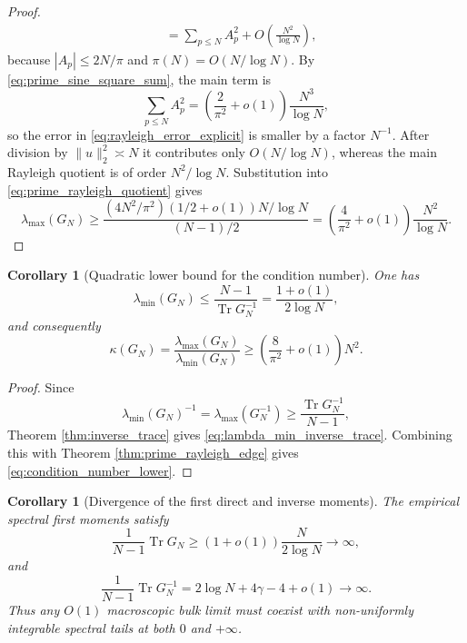 \documentclass[11pt]{amsart}
\numberwithin{equation}{section}
\theoremstyle{plain}
\newtheorem{corollary}[theorem]{Corollary}
\theoremstyle{definition}
\theoremstyle{remark}
\newcommand{\Tr}{\operatorname{Tr}}
\begin{document}
\begin{proof}
\begin{align}
&=\sum_{p\le N}A_p^2
 +O\!\left(\frac{N^2}{\log N}\right),
\label{eq:rayleigh_error_explicit}
\end{align}
because $|A_p|\le 2N/\pi$ and $\pi(N)=O(N/\log N)$.  By \eqref{eq:prime_sine_square_sum}, the main term is
\begin{equation}
\sum_{p\le N}A_p^2
=\left(\frac{2}{\pi^2}+o(1)\right)\frac{N^3}{\log N},
\end{equation}
so the error in \eqref{eq:rayleigh_error_explicit} is smaller by a factor $N^{-1}$.  After division by $\|u\|_2^2\asymp N$ it contributes only $O(N/\log N)$, whereas the main Rayleigh quotient is of order $N^2/\log N$.  Substitution into \eqref{eq:prime_rayleigh_quotient} gives
\begin{equation}
\lambda_{\max}(G_N)
\ge
\frac{(4N^2/\pi^2)(1/2+o(1))N/\log N}{(N-1)/2}
=
\left(\frac4{\pi^2}+o(1)\right)\frac{N^2}{\log N}.
\end{equation}
\end{proof}

\begin{corollary}[Quadratic lower bound for the condition number]
\label{cor:condition_number_lower}
One has
\begin{equation}
\lambda_{\min}(G_N)
\le \frac{N-1}{\Tr G_N^{-1}}
=\frac{1+o(1)}{2\log N},
\label{eq:lambda_min_inverse_trace}
\end{equation}
and consequently
\begin{equation}
\kappa(G_N)
=\frac{\lambda_{\max}(G_N)}{\lambda_{\min}(G_N)}
\ge
\left(\frac{8}{\pi^2}+o(1)\right)N^2.
\label{eq:condition_number_lower}
\end{equation}
\end{corollary}

\begin{proof}
Since
\begin{equation}
\lambda_{\min}(G_N)^{-1}
=\lambda_{\max}(G_N^{-1})
\ge \frac{\Tr G_N^{-1}}{N-1},
\end{equation}
Theorem \ref{thm:inverse_trace} gives \eqref{eq:lambda_min_inverse_trace}.  Combining this with Theorem \ref{thm:prime_rayleigh_edge} gives \eqref{eq:condition_number_lower}.
\end{proof}

\begin{corollary}[Divergence of the first direct and inverse moments]
\label{cor:moment_divergence}
The empirical spectral first moments satisfy
\begin{equation}
\frac{1}{N-1}\Tr G_N
\ge (1+o(1))\frac{N}{2\log N}\longrightarrow\infty,
\label{eq:direct_first_moment_diverges}
\end{equation}
and
\begin{equation}
\frac{1}{N-1}\Tr G_N^{-1}
=2\log N+4\gamma-4+o(1)\longrightarrow\infty.
\label{eq:inverse_first_moment_diverges}
\end{equation}
Thus any $O(1)$ macroscopic bulk limit must coexist with non-uniformly integrable spectral tails at both $0$ and $+\infty$.
\end{corollary}
\end{document}
